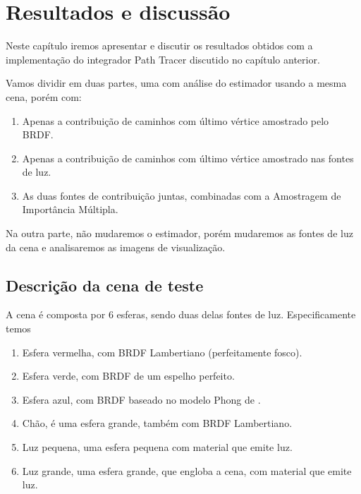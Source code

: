 \chapter{Resultados e discussão}
\label{cap:resultados}

\graphicspath{{\currfiledir/figuras/}}

Neste capítulo iremos apresentar e discutir os resultados obtidos com a
implementação do integrador Path Tracer discutido no capítulo anterior.

Vamos dividir em duas partes, uma com análise do estimador usando a mesma cena,
porém com:

\begin{enumerate}
  \item Apenas a contribuição de caminhos com último vértice amostrado pelo
  BRDF.
  \item Apenas a contribuição de caminhos com último vértice amostrado nas
  fontes de luz.
  \item As duas fontes de contribuição juntas, combinadas com a Amostragem de
  Importância Múltipla.
\end{enumerate}

Na outra parte, não mudaremos o estimador, porém mudaremos as fontes de luz da
cena e analisaremos as imagens de visualização.

\section{Descrição da cena de teste}

A cena é composta por 6 esferas, sendo duas delas fontes de luz. Especificamente
temos

\begin{enumerate}
  \item Esfera vermelha, com BRDF Lambertiano (perfeitamente fosco).
  \item Esfera verde, com BRDF de um espelho perfeito.
  \item Esfera azul, com BRDF baseado no modelo Phong de \citet{lafortune98}.
  \item Chão, é uma esfera grande, também com BRDF Lambertiano.
  \item Luz pequena, uma esfera pequena com material que emite luz.
  \item Luz grande, uma esfera grande, que engloba a cena, com material que emite luz.
\end{enumerate}


